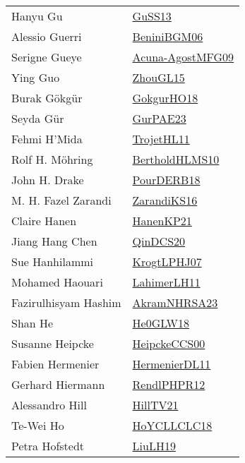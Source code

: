 {\begin{longtable}{p{4cm}p{20cm}}
Hanyu Gu & \href{papers/GuSS13.pdf}{GuSS13}\cite{GuSS13} \\
Alessio Guerri & \href{papers/BeniniBGM06.pdf}{BeniniBGM06}\cite{BeniniBGM06} \\
Serigne Gueye & \href{papers/Acuna-AgostMFG09.pdf}{Acuna-AgostMFG09}\cite{Acuna-AgostMFG09} \\
Ying Guo & \href{papers/ZhouGL15.pdf}{ZhouGL15}\cite{ZhouGL15} \\
Burak G{\"{o}}kg{\"{u}}r & \href{articles/GokgurHO18.pdf}{GokgurHO18}\cite{GokgurHO18} \\
Seyda G{\"{u}}r & \href{articles/GurPAE23.pdf}{GurPAE23}\cite{GurPAE23} \\
Fehmi H'Mida & \href{articles/TrojetHL11.pdf}{TrojetHL11}\cite{TrojetHL11} \\
Rolf H. M{\"{o}}hring & \href{papers/BertholdHLMS10.pdf}{BertholdHLMS10}\cite{BertholdHLMS10} \\
John H. Drake & \href{articles/PourDERB18.pdf}{PourDERB18}\cite{PourDERB18} \\
M. H. Fazel Zarandi & \href{articles/ZarandiKS16.pdf}{ZarandiKS16}\cite{ZarandiKS16} \\
Claire Hanen & \href{papers/HanenKP21.pdf}{HanenKP21}\cite{HanenKP21} \\
Jiang Hang Chen & \href{articles/QinDCS20.pdf}{QinDCS20}\cite{QinDCS20} \\
Sue Hanhilammi & \href{papers/KrogtLPHJ07.pdf}{KrogtLPHJ07}\cite{KrogtLPHJ07} \\
Mohamed Haouari & \href{papers/LahimerLH11.pdf}{LahimerLH11}\cite{LahimerLH11} \\
Fazirulhisyam Hashim & \href{articles/AkramNHRSA23.pdf}{AkramNHRSA23}\cite{AkramNHRSA23} \\
Shan He & \href{papers/He0GLW18.pdf}{He0GLW18}\cite{He0GLW18} \\
Susanne Heipcke & \href{articles/HeipckeCCS00.pdf}{HeipckeCCS00}\cite{HeipckeCCS00} \\
Fabien Hermenier & \href{papers/HermenierDL11.pdf}{HermenierDL11}\cite{HermenierDL11} \\
Gerhard Hiermann & \href{papers/RendlPHPR12.pdf}{RendlPHPR12}\cite{RendlPHPR12} \\
Alessandro Hill & \href{papers/HillTV21.pdf}{HillTV21}\cite{HillTV21} \\
Te{-}Wei Ho & \href{papers/HoYCLLCLC18.pdf}{HoYCLLCLC18}\cite{HoYCLLCLC18} \\
Petra Hofstedt & \href{papers/LiuLH19.pdf}{LiuLH19}\cite{LiuLH19} \\

\end{longtable}}
